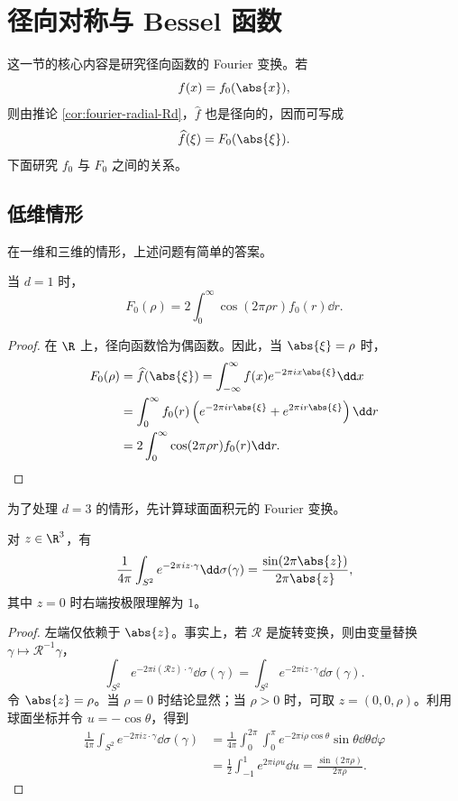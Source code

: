 \section{径向对称与 Bessel 函数}

这一节的核心内容是研究径向函数的 Fourier 变换。若
\[
f(x)=f_0(\abs{x}),
\]
则由推论 \ref{cor:fourier-radial-Rd}，$\widehat f$ 也是径向的，因而可写成
\[
\widehat f(\xi)=F_0(\abs{\xi}).
\]
下面研究 $f_0$ 与 $F_0$ 之间的关系。

\subsection*{低维情形}

在一维和三维的情形，上述问题有简单的答案。

\begin{proposition}\label{prop:radial-fourier-d1}
	当 $d=1$ 时，
	\[
	F_0(\rho)=2\int_0^\infty
	\cos(2\pi\rho r)f_0(r)\dd r.
	\]
\end{proposition}

\begin{proof}
	在 $\R$ 上，径向函数恰为偶函数。因此，当 $\abs{\xi}=\rho$ 时，
	\[
	\begin{aligned}
	F_0(\rho)
	&=\widehat f(\abs{\xi})
	=\int_{-\infty}^{\infty}f(x)e^{-2\pi i x\abs{\xi}}\dd x\\
	&=\int_0^\infty f_0(r)
	\left(e^{-2\pi i r\abs{\xi}}+e^{2\pi i r\abs{\xi}}\right)\dd r\\
	&=2\int_0^\infty\cos(2\pi\rho r)f_0(r)\dd r.
	\end{aligned}
	\]
\end{proof}

为了处理 $d=3$ 的情形，先计算球面面积元的 Fourier 变换。

\begin{lemma}\label{lem:sphere-fourier-d3}
	对 $z\in\R^3$，有
	\[
	\frac{1}{4\pi}\int_{S^2}e^{-2\pi i z\cdot\gamma}
	\dd\sigma(\gamma)
	=\frac{\sin(2\pi\abs{z})}{2\pi\abs{z}},
	\]
	其中 $z=0$ 时右端按极限理解为 $1$。
\end{lemma}

\begin{proof}
	左端仅依赖于 $\abs{z}$。事实上，若 $\mathcal R$ 是旋转变换，则由变量替换
	$\gamma\mapsto\mathcal R^{-1}\gamma$，
	\[
	\int_{S^2}e^{-2\pi i(\mathcal Rz)\cdot\gamma}\dd\sigma(\gamma)
	=\int_{S^2}e^{-2\pi i z\cdot\gamma}\dd\sigma(\gamma).
	\]
	令 $\abs{z}=\rho$。当 $\rho=0$ 时结论显然；当 $\rho>0$ 时，可取
	$z=(0,0,\rho)$。利用球面坐标并令 $u=-\cos\theta$，得到
	\[
	\begin{aligned}
	\frac{1}{4\pi}\int_{S^2}e^{-2\pi i z\cdot\gamma}\dd\sigma(\gamma)
	&=\frac{1}{4\pi}\int_0^{2\pi}\int_0^\pi
	e^{-2\pi i\rho\cos\theta}\sin\theta\dd\theta\dd\varphi\\
	&=\frac12\int_{-1}^1e^{2\pi i\rho u}\dd u
	=\frac{\sin(2\pi\rho)}{2\pi\rho}.
	\end{aligned}
	\]
\end{proof}

